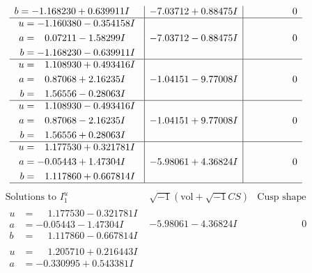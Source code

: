 \documentclass[1p]{elsarticle_modified}
\theoremstyle{definition}
\newcommand{\I}{\sqrt{-1}}
\begin{document}
$$\begin{array}{c|c|c}
\begin{aligned}
b &= -1.168230 + 0.639911 I\end{aligned}
 & -7.03712 + 0.88475 I & \phantom{-0.000000 } 0 \\ \hline\begin{aligned}
u &= -1.160380 - 0.354158 I \\
a &= \phantom{-}0.07211 - 1.58299 I \\
b &= -1.168230 - 0.639911 I\end{aligned}
 & -7.03712 - 0.88475 I & \phantom{-0.000000 } 0 \\ \hline\begin{aligned}
u &= \phantom{-}1.108930 + 0.493416 I \\
a &= \phantom{-}0.87068 + 2.16235 I \\
b &= \phantom{-}1.56556 - 0.28063 I\end{aligned}
 & -1.04151 - 9.77008 I & \phantom{-0.000000 } 0 \\ \hline\begin{aligned}
u &= \phantom{-}1.108930 - 0.493416 I \\
a &= \phantom{-}0.87068 - 2.16235 I \\
b &= \phantom{-}1.56556 + 0.28063 I\end{aligned}
 & -1.04151 + 9.77008 I & \phantom{-0.000000 } 0 \\ \hline\begin{aligned}
u &= \phantom{-}1.177530 + 0.321781 I \\
a &= -0.05443 + 1.47304 I \\
b &= \phantom{-}1.117860 + 0.667814 I\end{aligned}
 & -5.98061 + 4.36824 I & \phantom{-0.000000 } 0\\
 \hline 
 \end{array}$$\newpage$$\begin{array}{c|c|c}  
\text{Solutions to }I^u_{1}& \I (\text{vol} + \sqrt{-1}CS) & \text{Cusp shape}\\
 \hline 
\begin{aligned}
u &= \phantom{-}1.177530 - 0.321781 I \\
a &= -0.05443 - 1.47304 I \\
b &= \phantom{-}1.117860 - 0.667814 I\end{aligned}
 & -5.98061 - 4.36824 I & \phantom{-0.000000 } 0 \\ \hline\begin{aligned}
u &= \phantom{-}1.205710 + 0.216443 I \\
a &= -0.330995 + 0.543381 I \\

\end{aligned}
\end{array}$$
\end{document}
